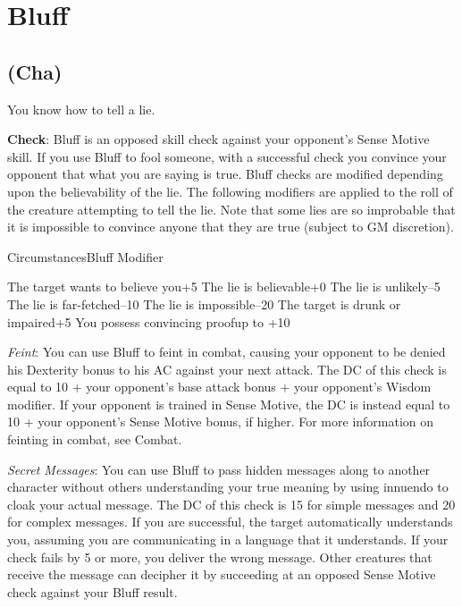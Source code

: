 \section{Bluff}

\label{f0}
\subsection{(Cha)}

				
You know how to tell a lie.
				
\textbf{Check}: Bluff is an opposed skill check against your opponent's Sense Motive skill. If you use Bluff to fool someone, with a successful check you convince your opponent that what you are saying is true. Bluff checks are modified depending upon the believability of the lie. The following modifiers are applied to the roll of the creature attempting to tell the lie. Note that some lies are so improbable that it is impossible to convince anyone that they are true (subject to GM discretion).

CircumstancesBluff Modifier


The target wants to believe you+5
The lie is believable+0
The lie is unlikely--5
The lie is far-fetched--10
The lie is impossible--20
The target is drunk or impaired+5
You possess convincing proofup to +10

				
\textit{Feint}: You can use Bluff to feint in combat, causing your opponent to be denied his Dexterity bonus to his AC against your next attack. The DC of this check is equal to 10 + your opponent's base attack bonus + your opponent's Wisdom modifier. If your opponent is trained in Sense Motive, the DC is instead equal to 10 + your opponent's Sense Motive bonus, if higher. For more information on feinting in combat, see Combat.
				
\textit{Secret Messages}: You can use Bluff to pass hidden messages along to another character without others understanding your true meaning by using innuendo to cloak your actual message. The DC of this check is 15 for simple messages and 20 for complex messages. If you are successful, the target automatically understands you, assuming you are communicating in a language that it understands. If your check fails by 5 or more, you deliver the wrong message. Other creatures that receive the message can decipher it by succeeding at an opposed Sense Motive check against your Bluff result. 
				

